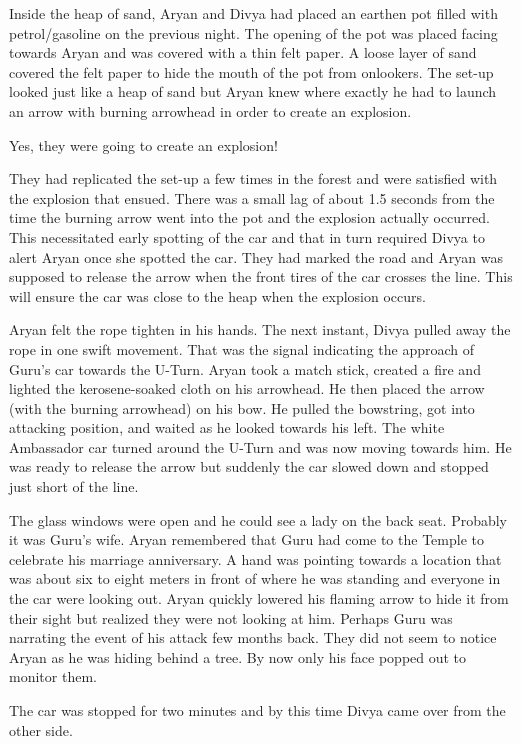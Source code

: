 Inside the heap of sand, Aryan and Divya had placed an earthen pot filled with
petrol/gasoline on the previous night. The opening of the pot was placed facing
towards Aryan and was covered with a thin felt paper. A loose layer of sand
covered the felt paper to hide the mouth of the pot from onlookers. The set-up
looked just like a heap of sand but Aryan knew where exactly he had to launch an
arrow with burning arrowhead in order to create an explosion.

Yes, they were going to create an explosion!

They had replicated the set-up a few times in the forest and were satisfied with
the explosion that ensued. There was a small lag of about 1.5 seconds from the
time the burning arrow went into the pot and the explosion actually occurred.
This necessitated early spotting of the car and that in turn required Divya to
alert Aryan once she spotted the car. They had marked the road and Aryan was
supposed to release the arrow when the front tires of the car crosses the line.
This will ensure the car was close to the heap when the explosion occurs.

Aryan felt the rope tighten in his hands. The next instant, Divya pulled away
the rope in one swift movement. That was the signal indicating the approach of
Guru's car towards the U-Turn. Aryan took a match stick, created a fire and
lighted the kerosene-soaked cloth on his arrowhead. He then placed the arrow
(with the burning arrowhead) on his bow. He pulled the bowstring, got into
attacking position, and waited as he looked towards his left. The white
Ambassador car turned around the U-Turn and was now moving towards him. He was
ready to release the arrow but suddenly the car slowed down and stopped just
short of the line.

The glass windows were open and he could see a lady on the back seat. Probably
it was Guru's wife. Aryan remembered that Guru had come to the Temple to
celebrate his marriage anniversary. A hand was pointing towards a location that
was about six to eight meters in front of where he was standing and everyone in
the car were looking out. Aryan quickly lowered his flaming arrow to hide it
from their sight but realized they were not looking at him. Perhaps Guru was
narrating the event of his attack few months back. They did not seem to notice
Aryan as he was hiding behind a tree. By now only his face popped out to monitor
them.

The car was stopped for two minutes and by this time Divya came over from the
other side.

